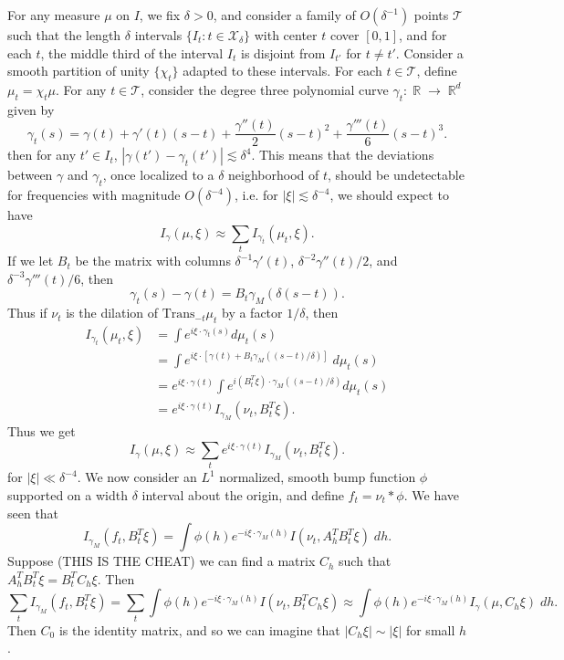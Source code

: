 \documentclass[dvipsnames,letterpaper,12pt]{article}
\DeclareMathOperator{\RR}{\mathbb{R}}
\begin{document}
For any measure $\mu$ on $I$, we fix $\delta > 0$, and consider a family of $O(\delta^{-1})$ points $\mathcal{T}$ such that the length $\delta$ intervals $\{ I_t : t \in \mathcal{X}_\delta \}$ with center $t$ cover $[0,1]$, and for each $t$, the middle third of the interval $I_t$ is disjoint from $I_{t'}$ for $t \neq t'$. Consider a smooth partition of unity $\{ \chi_t \}$ adapted to these intervals. For each $t \in \mathcal{T}$, define $\mu_t = \chi_t \mu$. For any $t \in \mathcal{T}$, consider the degree three polynomial curve $\gamma_t: \RR \to \RR^d$ given by
%
\[ \gamma_t(s) = \gamma(t) + \gamma'(t) (s - t) + \frac{\gamma''(t)}{2} (s - t)^2 + \frac{\gamma'''(t)}{6} (s - t)^3. \]
%
then for any $t' \in I_t$, $|\gamma(t') - \gamma_t(t')| \lesssim \delta^4$. This means that the deviations between $\gamma$ and $\gamma_t$, once localized to a $\delta$ neighborhood of $t$, should be undetectable for frequencies with magnitude $O(\delta^{-4})$, i.e. for $|\xi| \lesssim \delta^{-4}$, we should expect to have
%
\[ I_\gamma(\mu,\xi) \approx \sum_t I_{\gamma_t}(\mu_t, \xi). \]
%
If we let $B_t$ be the matrix with columns $\delta^{-1} \gamma'(t)$, $\delta^{-2} \gamma''(t) / 2$, and $\delta^{-3} \gamma'''(t) / 6$, then
%
\[ \gamma_t(s) - \gamma(t) = B_t \gamma_M(\delta (s - t)). \]
%
Thus if $\nu_t$ is the dilation of $\text{Trans}_{-t} \mu_t$ by a factor $1/\delta$, then
\begin{align*}
    I_{\gamma_t}(\mu_t,\xi) &= \int e^{i \xi \cdot \gamma_t(s)} d\mu_t(s)\\
    &= \int e^{i \xi \cdot [\gamma(t) + B_t \gamma_M((s - t) / \delta)]}\; d\mu_t(s)\\
    &= e^{i \xi \cdot \gamma(t)} \int e^{i (B_t^T \xi) \cdot \gamma_M((s - t) / \delta)} d\mu_t(s)\\
    &= e^{i \xi \cdot \gamma(t)} I_{\gamma_M}(\nu_t, B_t^T \xi ).
\end{align*}
Thus we get
%
\[ I_\gamma(\mu,\xi) \approx \sum_t e^{i \xi \cdot \gamma(t)} I_{\gamma_M}(\nu_t, B_t^T \xi). \]
%
for $|\xi| \ll \delta^{-4}$. We now consider an $L^1$ normalized, smooth bump function $\phi$ supported on a width $\delta$ interval about the origin, and define $f_t = \nu_t * \phi$. We have seen that
%
\[ I_{\gamma_M}(f_t, B_t^T \xi) = \int \phi(h) e^{-i \xi \cdot \gamma_M(h)} I(\nu_t,A_h^T B_t^T \xi)\; dh. \]
%
Suppose (THIS IS THE CHEAT) we can find a matrix $C_h$ such that $A_h^T B_t^T \xi = B_t^T C_h \xi$. Then
%
\[ \sum_t I_{\gamma_M}(f_t, B_t^T \xi) = \sum_t \int \phi(h) e^{-i \xi \cdot \gamma_M(h)} I(\nu_t, B_t^T C_h \xi) \approx \int \phi(h) e^{-i \xi \cdot \gamma_M(h)} I_\gamma(\mu, C_h \xi)\; dh. \]
%
Then $C_0$ is the identity matrix, and so we can imagine that $|C_h \xi| \sim |\xi|$ for small $h$.
\end{document}
